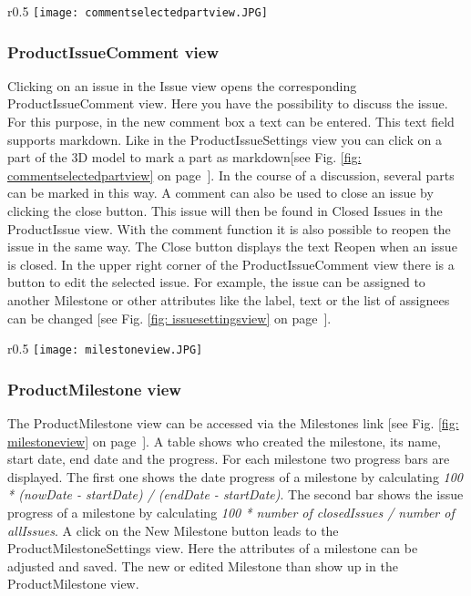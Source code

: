 \begin{wrapfigure}{r}{0.5\textwidth}
    \centering
    \texttt{[image: commentselectedpartview.JPG]}
    \caption{Selected part in ProductIssueComment view}
    \label{fig: commentselectedpartview}
\end{wrapfigure}

\subsubsection*{ProductIssueComment view}

Clicking on an issue in the Issue view opens the corresponding ProductIssueComment view.  Here you have the possibility to discuss the issue. 
For this purpose, in the new comment box a text can be entered. This text field supports markdown.
Like in the ProductIssueSettings view you can click on a part of the 3D model to mark a part as markdown[see Fig. \ref{fig: commentselectedpartview} on page~\pageref{fig: commentselectedpartview}]. In the course of a discussion, several parts can be marked in this way.
A comment can also be used to close an issue by clicking the close button. This issue will then be found in Closed Issues in the ProductIssue view. With the comment function it is also possible to reopen the issue in the same way. The Close button displays the text Reopen when an issue is closed. In the upper right corner of the ProductIssueComment view there is a button to edit the selected issue. For example, the issue can be assigned to another Milestone or other attributes like the label, text or the list of assignees can be changed [see Fig. \ref{fig: issuesettingsview} on page~\pageref{fig: issuesettingsview}].

\begin{wrapfigure}{r}{0.5\textwidth}
    \centering
    \texttt{[image: milestoneview.JPG]}
    \caption{ProductMilestone view}
    \label{fig: milestoneview}
\end{wrapfigure}

\subsubsection*{ProductMilestone view}

The ProductMilestone view can be accessed via the Milestones link [see Fig. \ref{fig: milestoneview} on page~\pageref{fig: milestoneview}]. A table shows who created the milestone, its name, start date, end date and the progress. For each milestone two progress bars are displayed. The first one shows the date progress of a milestone by calculating \textit{100 * (nowDate - startDate) / (endDate - startDate)}. The second bar shows the issue progress of a milestone by calculating \textit{100 * number of closedIssues / number of allIssues}.
A click on the New Milestone button leads to the ProductMilestoneSettings view. Here the attributes of a milestone can be adjusted and saved. The new or edited Milestone than show up in the ProductMilestone view.

